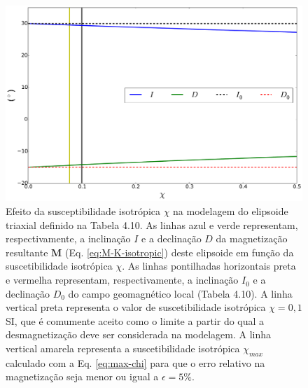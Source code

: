 \begin{figure}[hbt!]
	\centering \includegraphics[width=13.5 cm,height=9 cm]{figures/test_k_triaxial}
	\caption[Efeito da susceptibilidade isotrópica $\chi$ na modelagem do elipsoide triaxial definido na Tabela 4.10. As linhas azul e verde representam, respectivamente, a inclinação $I$ e a declinação $D$ da magnetização resultante $\mathbf{M}$ (Eq. \ref{eq:M-K-isotropic}) deste elipsoide em função da suscetibilidade isotrópica $\chi$. As linhas pontilhadas horizontais preta e vermelha representam, respectivamente, a inclinação $I_{0}$ e a declinação $D_{0}$ do campo geomagnético local (Tabela 4.10). A linha vertical preta representa o valor de suscetibilidade isotrópica $\chi = 0,1$ SI, que é comumente aceito como o limite a partir do qual a desmagnetização deve ser considerada na modelagem. A linha vertical amarela representa a suscetibilidade isotrópica $\chi_{max}$ calculado com a Eq. \ref{eq:max-chi} para que o erro relativo na magnetização seja menor ou igual a $\epsilon = 5 \%$.]
	{Efeito da susceptibilidade isotrópica $\chi$ na modelagem do elipsoide triaxial definido na Tabela 4.10. As linhas azul e verde representam, respectivamente, a inclinação $I$ e a declinação $D$ da magnetização resultante $\mathbf{M}$ (Eq. \ref{eq:M-K-isotropic}) deste elipsoide em função da suscetibilidade isotrópica $\chi$. As linhas pontilhadas horizontais preta e vermelha representam, respectivamente, a inclinação $I_{0}$ e a declinação $D_{0}$ do campo geomagnético local (Tabela 4.10). A linha vertical preta representa o valor de suscetibilidade isotrópica $\chi = 0,1$ SI, que é comumente aceito como o limite a partir do qual a desmagnetização deve ser considerada na modelagem. A linha vertical amarela representa a suscetibilidade isotrópica $\chi_{max}$ calculado com a Eq. \ref{eq:max-chi} para que o erro relativo na magnetização seja menor ou igual a $\epsilon = 5 \%$.}
	\label{fig:test_k_triaxial}
\end{figure}

